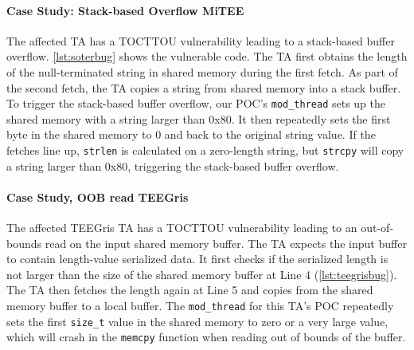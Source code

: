 \documentclass[conference]{IEEEtran}
\newcommand{\mitee}{MiTEE\xspace}
\newcommand{\teegris}{TEEGris\xspace}
\begin{document}
\paragraph{Case Study: Stack-based Overflow \mitee}

\begin{listing}[h]
    
    \label{lst:soterbug}
\end{listing}

The affected TA has a TOCTTOU vulnerability 
leading to a stack-based buffer overflow. \autoref{lst:soterbug} shows the vulnerable code. 
The TA first obtains the length of the null-terminated string in shared memory during the first 
fetch. As part of the second fetch, the TA copies a string from shared memory into a stack buffer. 
To trigger the stack-based buffer overflow, our POC's \texttt{mod\_thread} sets up the shared 
memory with a string larger than 0x80. It then repeatedly sets the 
first byte in the shared memory to 0 and back to the original string value. If the fetches 
line up, \texttt{strlen} is calculated on a zero-length string, but \texttt{strcpy} will 
copy a string larger than 0x80, triggering the stack-based buffer overflow.

\paragraph{Case Study, OOB read \teegris}

\begin{listing}[h]
    
    \label{lst:teegrisbug}
\end{listing}

The affected \teegris TA has a TOCTTOU vulnerability leading to an out-of-bounds read on the 
input shared memory buffer. The TA expects the input buffer to contain length-value 
serialized data. It first checks if the 
serialized length is not larger than the size of the shared memory buffer at Line 4 (\autoref{lst:teegrisbug}).
The TA then fetches the length again at Line 5 and copies from the shared memory buffer to 
a local buffer. The \texttt{mod\_thread} for this TA's POC repeatedly sets the 
first \texttt{size\_t} value in the shared memory to zero or a very large value, 
which will crash in the \texttt{memcpy} function when reading out of bounds of the buffer.
\end{document}
